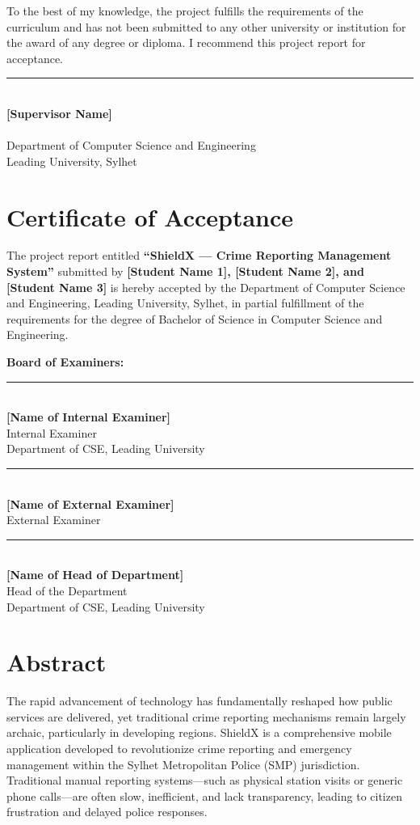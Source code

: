 \documentclass[11pt, a4paper]{report}
\begin{document}
To the best of my knowledge, the project fulfills the requirements of the curriculum and has not been submitted to any other university or institution for the award of any degree or diploma. I recommend this project report for acceptance.

\vspace{2cm}
\noindent\rule{6cm}{0.4pt}\\
\textbf{[Supervisor Name]}\\
\relax [Designation]\\
Department of Computer Science and Engineering\\
Leading University, Sylhet

\chapter*{Certificate of Acceptance}
The project report entitled \textbf{``ShieldX --- Crime Reporting Management System''} submitted by \textbf{[Student Name 1], [Student Name 2], and [Student Name 3]} is hereby accepted by the Department of Computer Science and Engineering, Leading University, Sylhet, in partial fulfillment of the requirements for the degree of Bachelor of Science in Computer Science and Engineering.

\vspace{1cm}
\noindent\textbf{Board of Examiners:}

\vspace{2cm}
\noindent\rule{6cm}{0.4pt}\\
\textbf{[Name of Internal Examiner]}\\
Internal Examiner\\
Department of CSE, Leading University

\vspace{2cm}
\noindent\rule{6cm}{0.4pt}\\
\textbf{[Name of External Examiner]}\\
External Examiner\\

\vspace{2cm}
\noindent\rule{6cm}{0.4pt}\\
\textbf{[Name of Head of Department]}\\
Head of the Department\\
Department of CSE, Leading University

\chapter*{Abstract}
The rapid advancement of technology has fundamentally reshaped how public services are delivered, yet traditional crime reporting mechanisms remain largely archaic, particularly in developing regions. ShieldX is a comprehensive mobile application developed to revolutionize crime reporting and emergency management within the Sylhet Metropolitan Police (SMP) jurisdiction. Traditional manual reporting systems---such as physical station visits or generic phone calls---are often slow, inefficient, and lack transparency, leading to citizen frustration and delayed police responses. 
\end{document}
